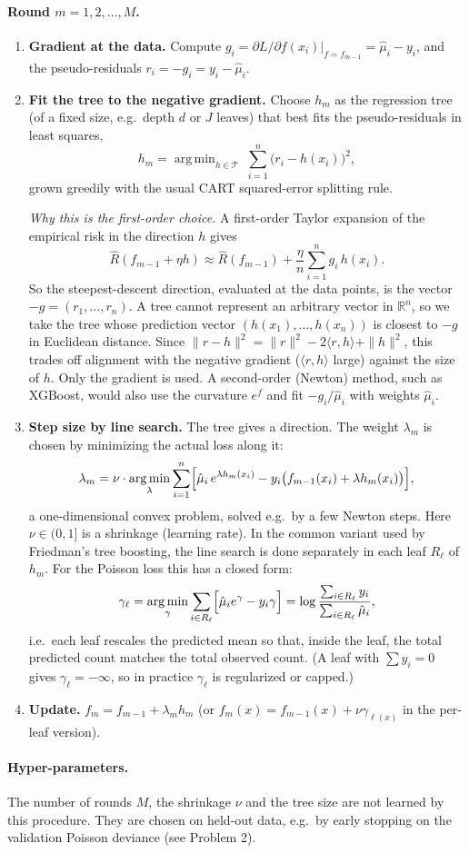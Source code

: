 \documentclass[11pt]{article}
\newcommand{\R}{\mathbb{R}}
\DeclareMathOperator*{\argmin}{arg\,min}
\begin{document}
\paragraph{Round $m=1,2,\dots,M$.}
\begin{enumerate}
\item \textbf{Gradient at the data.} Compute
$g_i=\partial L/\partial f(x_i)\big|_{f=f_{m-1}}=\hat\mu_i-y_i$, and the pseudo-residuals
$r_i=-g_i=y_i-\hat\mu_i$.

\item \textbf{Fit the tree to the negative gradient.} Choose $h_m$ as the regression tree
(of a fixed size, e.g.\ depth $d$ or $J$ leaves) that best fits the pseudo-residuals in least
squares,
\[
h_m=\argmin_{h\in\mathcal T}\;\sum_{i=1}^n\bigl(r_i-h(x_i)\bigr)^2 ,
\]
grown greedily with the usual CART squared-error splitting rule.

\emph{Why this is the first-order choice.} A first-order Taylor expansion of the empirical risk
in the direction $h$ gives
\[
\widehat R(f_{m-1}+\eta h)\approx\widehat R(f_{m-1})+\frac{\eta}{n}\sum_{i=1}^n g_i\,h(x_i).
\]
So the steepest-descent direction, evaluated at the data points, is the vector
$-g=(r_1,\dots,r_n)$. A tree cannot represent an arbitrary vector in $\R^n$, so we take the tree
whose prediction vector $(h(x_1),\dots,h(x_n))$ is closest to $-g$ in Euclidean distance.
Since $\|r-h\|^2=\|r\|^2-2\langle r,h\rangle+\|h\|^2$, this trades off alignment with the
negative gradient ($\langle r,h\rangle$ large) against the size of $h$. Only the gradient is
used. A second-order (Newton) method, such as XGBoost, would also use the curvature $e^{f}$ and fit
$-g_i/\hat\mu_i$ with weights $\hat\mu_i$.

\item \textbf{Step size by line search.} The tree gives a direction. The weight $\lambda_m$
is chosen by minimizing the actual loss along it:
\[
\lambda_m=\nu\cdot\argmin_{\lambda}\sum_{i=1}^n\Bigl[\hat\mu_i\,e^{\lambda h_m(x_i)}-y_i\bigl(f_{m-1}(x_i)+\lambda h_m(x_i)\bigr)\Bigr],
\]
a one-dimensional convex problem, solved e.g.\ by a few Newton steps. Here $\nu\in(0,1]$ is a
shrinkage (learning rate). In the common variant used by Friedman's tree boosting, the line search
is done separately in each leaf $R_{\ell}$ of $h_m$. For the Poisson loss this has a closed form:
\[
\gamma_{\ell}=\argmin_{\gamma}\sum_{i\in R_\ell}\Bigl[\hat\mu_ie^{\gamma}-y_i\gamma\Bigr]
=\log\frac{\sum_{i\in R_\ell}y_i}{\sum_{i\in R_\ell}\hat\mu_i},
\]
i.e.\ each leaf rescales the predicted mean so that, inside the leaf, the total predicted count
matches the total observed count. (A leaf with $\sum y_i=0$ gives $\gamma_\ell=-\infty$, so in
practice $\gamma_\ell$ is regularized or capped.)

\item \textbf{Update.} $f_m=f_{m-1}+\lambda_mh_m$ (or $f_m(x)=f_{m-1}(x)+\nu\gamma_{\ell(x)}$ in the
per-leaf version).
\end{enumerate}

\paragraph{Hyper-parameters.} The number of rounds $M$, the shrinkage $\nu$ and the tree size are
not learned by this procedure. They are chosen on held-out data, e.g.\ by early stopping on the
validation Poisson deviance (see Problem 2).
\end{document}
